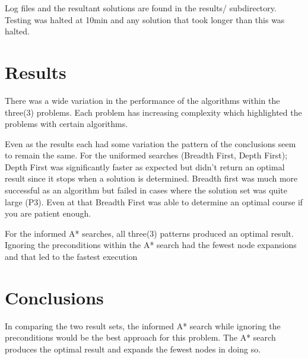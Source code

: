 \documentclass[paper=letter, fontsize=12pt]{article}
\begin{document}
Log files and the resultant solutions are found in the results/ subdirectory. Testing was halted at 10min and any solution that took longer than this was halted.

\section{Results}

There was a wide variation in the performance of the algorithms within the three(3) problems. Each problem has increasing complexity which highlighted the problems with certain algorithms.

Even as the results each had some variation the pattern of the conclusions seem to remain the same. For the uniformed searches (Breadth First, Depth First); Depth First was significantly faster as expected but didn't return an optimal result since it stops when a solution is determined. Breadth first was much more successful as an algorithm but failed in cases where the solution set was quite large (P3). Even at that Breadth First was able to determine an optimal course if you are patient enough.

For the informed A* searches, all three(3) patterns produced an optimal result. Ignoring the preconditions within the A* search had the fewest node expansions and that led to the fastest execution


\section{Conclusions}
In comparing the two result sets, the informed A* search while ignoring the preconditions would be the best approach for this problem. The A* search produces the optimal result and expands the fewest nodes in doing so.



\end{document}
